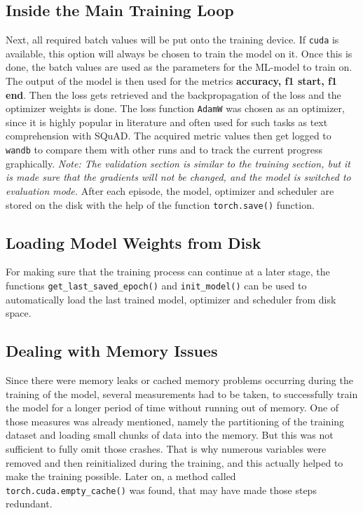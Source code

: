         \subsection{Inside the Main Training Loop}
        \label{sec:-inside-the-main-training-loop}
            Next, all required batch values will be put onto the training device. If \texttt{cuda} is available, this option will always be chosen to train the model on it.
            Once this is done, the batch values are used as the parameters for the ML-model to train on.
            The output of the model is then used for the metrics \textbf{accuracy, f1 start, f1 end}.
            Then the loss gets retrieved and the backpropagation of the loss and the optimizer weights is done.
            The loss function \texttt{AdamW} was chosen as an optimizer, since it is highly popular in literature and often used for such tasks as text comprehension with SQuAD.
            The acquired metric values then get logged to \texttt{wandb} to compare them with other runs and to track the current progress graphically.
            \emph{Note: The validation section is similar to the training section, but it is made sure that the gradients will not be changed, and the model is switched to evaluation mode.}
            After each episode, the model, optimizer and scheduler are stored on the disk with the help of the function \texttt{torch.save()} function.

        \subsection{Loading Model Weights from Disk}
        \label{sec:-loading-model-weights-from-disk}
            For making sure that the training process can continue at a later stage, the functions \texttt{get\_last\_saved\_epoch()} and \texttt{init\_model()} can be used to automatically load the last trained model, optimizer and scheduler from disk space.

        \subsection{Dealing with Memory Issues}
        \label{sec:-dealing-with-memory-issues}
            Since there were memory leaks or cached memory problems occurring during the training of the model, several measurements had to be taken, to successfully train the model for a longer period of time without running out of memory. One of those measures was already mentioned, namely the partitioning of the training dataset and loading small chunks of data into the memory.
            But this was not sufficient to fully omit those crashes. That is why numerous variables were removed and then reinitialized during the training, and this actually helped to make the training possible.
            Later on, a method called \texttt{torch.cuda.empty\_cache()} was found, that may have made those steps redundant.
        

